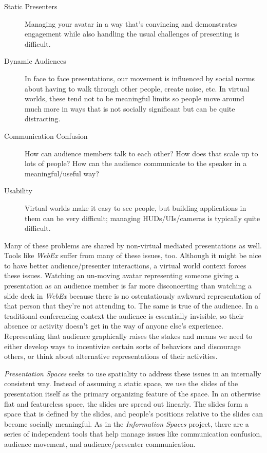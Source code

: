 \begin{description}
\item[Static Presenters]{Managing your avatar in a way that's convincing and demonstrates engagement while also handling the usual challenges of presenting is difficult.}
\item[Dynamic Audiences]{In face to face presentations, our movement is influenced by social norms about having to walk through other people, create noise, etc. In virtual worlds, these tend not to be meaningful limits so people move around much more in ways that is not socially significant but can be quite distracting.}
\item[Communication Confusion]{How can audience members talk to each other? How does that scale up to lots of people? How can the audience communicate to the speaker in a meaningful/useful way?}
\item[Usability]{Virtual worlds make it easy to see people, but building applications in them can be very difficult; managing HUDs/UIs/cameras is typically quite difficult.}
\end{description}

Many of these problems are shared by non-virtual mediated presentations as well. Tools like \emph{WebEx} suffer from many of these issues, too. Although it might be nice to have better audience/presenter interactions, a virtual world context forces these issues. Watching an un-moving avatar representing someone giving a presentation as an audience member is far more disconcerting than watching a slide deck in \emph{WebEx} because there is no ostentatiously awkward representation of that person that they're not attending to. The same is true of the audience. In a traditional conferencing context the audience is essentially invisible, so their absence or activity doesn't get in the way of anyone else's experience. Representing that audience graphically raises the stakes and means we need to either develop ways to incentivize certain sorts of behaviors and discourage others, or think about alternative representations of their activities. 

\emph{Presentation Spaces} seeks to use spatiality to address these issues in an internally consistent way. Instead of assuming a static space, we use the slides of the presentation itself as the primary organizing feature of the space. In an otherwise flat and featureless space, the slides are spread out linearly. The slides form a space that is defined by the slides, and people's positions relative to the slides can become socially meaningful. As in the \emph{Information Spaces} project, there are a series of independent tools that help manage issues like communication confusion, audience movement, and audience/presenter communication. 

